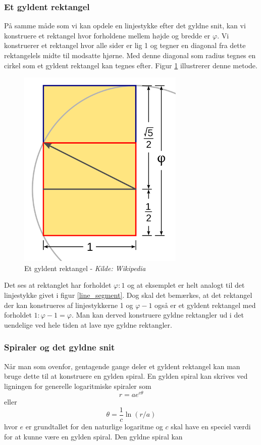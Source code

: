 {\subsubsection{Et gyldent rektangel}
På samme måde som vi kan opdele en linjestykke efter det gyldne snit,
kan vi konstruere et rektangel hvor forholdene mellem højde og bredde er
$\varphi$. Vi konstruerer et rektangel hvor alle sider er lig 1 og
tegner en diagonal fra dette rektangelels midte til modsatte hjørne. Med
denne diagonal som radius tegnes en cirkel som et gyldent rektangel kan
tegnes efter. Figur \ref{golden_rectangle} illustrerer denne metode.

\begin{figure}[h!]
	\begin{center}
		\includegraphics[scale=0.35,angle=0]{afsnit/baggrund/billeder/Golden_Rectangle_Construction}
	\end{center}
	\caption[Et gyldent rektangel]{Et gyldent rektangel - \emph{Kilde: Wikipedia}}
	\label{golden_rectangle}
\end{figure}
Det ses at rektanglet har forholdet $\varphi:1$ og at eksemplet er helt
analogt til det linjestykke givet i figur \ref{line_segment}. Dog skal
det bemærkes, at det rektangel der kan konstrueres af linjestykkerne 1
og $\varphi - 1$ også er et gyldent rektangel med forholdet $1:\varphi
-1 = \varphi$. Man kan derved konstruere gyldne rektangler ud i det
uendelige ved hele tiden at lave nye gyldne rektangler.

\subsubsection{Spiraler og det gyldne snit}
Når man som ovenfor, gentagende gange deler et gyldent rektangel kan man
bruge dette til at konstruere en gylden spiral. En gylden spiral kan
skrives ved ligningen for generelle logaritmiske spiraler som
\begin{equation}
	r = ae^{c\theta}
	\label{log_spiral_2}
\end{equation}
eller
\begin{equation}
	\theta = \frac{1}{c}\ln(r/a)
	\label{log_spiral_1}
\end{equation}
hvor $e$ er grundtallet for den naturlige logaritme og $c$ skal have en
speciel værdi for at kunne være en gylden spiral. Den gyldne spiral kan

}
